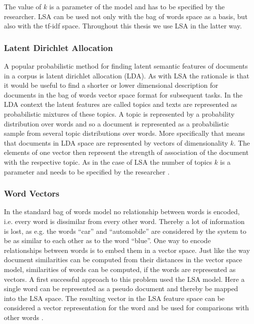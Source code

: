 The value of $k$ is a parameter of the model and has to be specified
by the researcher. LSA can be used not only with the bag of words space as a basis, but also with the tf-idf space. Throughout this thesis we use LSA in the latter way.


\subsubsection*{Latent Dirichlet Allocation}

A popular probabilistic method for finding latent semantic features
of documents in a corpus is latent dirichlet allocation (LDA). As
with LSA the rationale is that it would be useful to find a shorter
or lower dimensional description for documents in the bag of words
vector space format for subsequent tasks. In the LDA context the latent
features are called topics and texts are represented as probabilistic
mixtures of these topics. A topic is represented by a probability
distribution over words and so a document is represented as a probabilistic
sample from several topic distributions over words. More specifically that means that documents in LDA space are represented by vectors of dimensionality $k$. The elements of one vector then represent the strength of association of the document with the respective topic. As in the case of LSA the
number of topics $k$ is a parameter and needs to be specified by
the researcher \citep{Blei2003}. 


\subsubsection*{Word Vectors}

In the standard bag of words model no relationship between words is
encoded, i.e. every word is dissimilar from every other word. Thereby
a lot of information is lost, as e.g. the words ``car'' and ``automobile''
are considered by the system to be as similar to each other as to
the word ``blue''. One way to encode relationships between words
is to embed them in a vector space. Just like the way document similarities
can be computed from their distances in the vector space model, similarities
of words can be computed, if the words are represented as vectors.
A first successful approach to this problem used the LSA model. Here
a single word can be represented as a pseudo document and thereby
be mapped into the LSA space. The resulting vector in the LSA feature
space can be considered a vector representation for the word and be
used for comparisons with other words \citep{Deerwester1990}.

